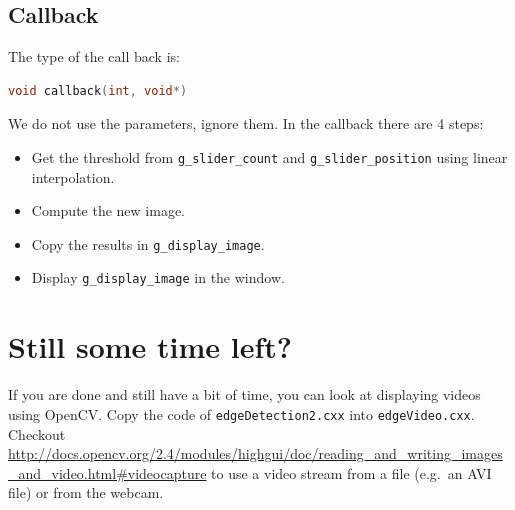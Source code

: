 \documentclass[english,a4paper,12pt,oneside]{article}
\begin{document}
 \subsection{Callback}
 
The type of the call back is:
\begin{lstlisting}[language=c++]
void callback(int, void*)
\end{lstlisting}
We do not use the parameters, ignore them.
In the callback there are 4 steps:
\begin{itemize}
 \item Get the threshold from \verb+g_slider_count+ and \verb+g_slider_position+ using linear interpolation.
 \item Compute the new image.
 \item Copy the results in \verb+g_display_image+.
 \item Display \verb+g_display_image+ in the window.
\end{itemize}


\section{Still some time left?}

If you are done and still have a bit of time, you can look at displaying videos using OpenCV.
Copy the code of \verb+edgeDetection2.cxx+ into \verb+edgeVideo.cxx+. 
Checkout \url{http://docs.opencv.org/2.4/modules/highgui/doc/reading_and_writing_images_and_video.html#videocapture} to use a video stream from a file (e.g.~an AVI file) or from the webcam. 
\end{document}
